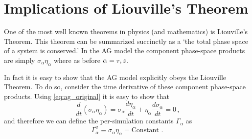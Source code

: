 
\section{Implications of Liouville's Theorem} \label{sec:liouville}

One of the most well known theorems in physics (and mathematics) is Liouville's Theorem.
This theorem can be summarized succinctly as a `the total phase space of a system is conserved.'
In the AG model the component phase-space products are simply $\sigma_{\alpha} \eta_{\alpha}$ where as before $ \alpha = {\scriptscriptstyle T}, z$.

In fact it is easy to show that the AG model explicitly obeys the Liouville Theorem.
To do so, consider the time derivative of these component phase-space products.
Using \ref{eq:ag_original} it is easy to show that
\begin{equation}
  \frac{d}{dt} (\sigma_{\alpha} \eta_{\alpha}) = \sigma_{\alpha} \frac{d \eta_{\alpha}}{dt} + \eta_{\alpha} \frac{d \sigma_{\alpha}}{dt} = 0 \,\text{,}
\end{equation}
and therefore we can define the per-simulation constants $\Gamma_{\alpha}$ as
\begin{equation} \label{eq:define_big_gamma}
  \Gamma_{\alpha}^2 \equiv \sigma_{\alpha} \eta_{\alpha} = \text{Constant .}
\end{equation}

